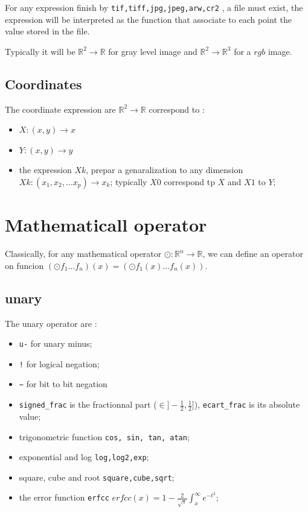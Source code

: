 For any expression finish by  {\tt tif,tiff,jpg,jpeg,arw,cr2} , a file
must exist, the expression will be interpreted as  the function
that associate to each point the value stored in the file.

Typically it will be $\mathbb{R}^2  \rightarrow  \mathbb{R}$ for gray level image
and $\mathbb{R}^2  \rightarrow  \mathbb{R}^3$ for a $rgb$ image.

\subsection{Coordinates}

The coordinate expression are $\mathbb{R}^2  \rightarrow  \mathbb{R}$  correspond to :

\begin{itemize}
   \item  $X : (x,y) \rightarrow x$
   \item  $Y : (x,y) \rightarrow y$
   \item the expression $Xk$, prepar a genaralization to any dimension $Xk : (x_1,x_2, \dots x_p)  \rightarrow  x_k$;
         typically $X0$ correspond tp $X$ and $X1$ to $Y$;
\end{itemize}


\section{Mathematicall operator}

Classically, for any mathematical operator $\odot : \mathbb{R}^n  \rightarrow  \mathbb{R}$,
we can define an operator on funcion   $(\odot f_1 \dots f_n) (x) = (\odot f_1(x) \dots f_n(x)) $.

\subsection{unary}

The unary operator are :

\begin{itemize}
   \item {\tt u-}  for unary minus;
   \item {\tt !}  for logical negation;
   \item {\tt \textasciitilde}  for bit to bit negation
   \item {\tt signed\_frac}  is the fractionnal part ($\in ]-\frac{1}{2},\frac{1}{2}]$),  {\tt ecart\_frac} is
         its absolute value;
   \item trigonometric function {\tt cos, sin, tan, atan};
   \item exponential and log {\tt log,log2,exp};
   \item square, cube and root {\tt square,cube,sqrt};
   \item the error function {\tt erfcc}  $ erfcc(x) =  1-{\frac {2}{\sqrt {\pi }}}\int _{x}^{\infty }e^{-t^{2}}$;
\end{itemize}


